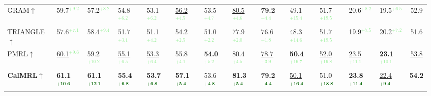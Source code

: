\begin{table}[t]
\begin{adjustbox}{width=\textwidth,center}
\begin{tabular}{@{}l|ll|ll|ll|ll|ll|ll|c@{}}
GRAM$\uparrow$  & 59.7\textcolor{lightgreen}{$^\text{+9.2}$}  & 57.2\textcolor{lightgreen}{$^\text{+8.2}$}  & 54.8\textcolor{lightgreen}{$^\text{+6.2}$} & 53.1\textcolor{lightgreen}{$^\text{+6.2}$} & \underline{56.2}\textcolor{lightgreen}{$^\text{+4.5}$} & 53.5\textcolor{lightgreen}{$^\text{+4.7}$} & \underline{80.5}\textcolor{lightgreen}{$^\text{+4.6}$} & \textbf{79.2\textcolor{lightgreen}{$^\text{+4.4}$}} & 49.1\textcolor{lightgreen}{$^\text{+15.4}$} & 51.7\textcolor{lightgreen}{$^\text{+19.5}$} & 20.6\textcolor{lightgreen}{$^\text{+8.2}$} & 19.5\textcolor{lightgreen}{$^\text{+6.5}$}  & 52.9 \\
TRIANGLE$\uparrow$  & 57.6\textcolor{lightgreen}{$^\text{+7.1}$}           & 58.4\textcolor{lightgreen}{$^\text{+9.4}$}           & 51.7\textcolor{lightgreen}{$^\text{+3.1}$}           & 51.1\textcolor{lightgreen}{$^\text{+4.2}$}           & 54.2\textcolor{lightgreen}{$^\text{+2.5}$}           & 51.0\textcolor{lightgreen}{$^\text{+2.2}$}           & 77.9\textcolor{lightgreen}{$^\text{+2.0}$}           & 76.6\textcolor{lightgreen}{$^\text{+1.8}$}           & 48.3\textcolor{lightgreen}{$^\text{+14.6}$}          & 51.7\textcolor{lightgreen}{$^\text{+19.5}$}          & 19.9\textcolor{lightgreen}{$^\text{+7.5}$}           & 20.2\textcolor{lightgreen}{$^\text{+7.2}$}    & 51.6        \\
PMRL$\uparrow$   & \underline{60.1}\textcolor{lightgreen}{$^\text{+9.6}$}           & 59.2\textcolor{lightgreen}{$^\text{+10.2}$}          & \underline{55.1}\textcolor{lightgreen}{$^\text{+6.5}$}           & \underline{53.3}\textcolor{lightgreen}{$^\text{+6.4}$}           & 55.8\textcolor{lightgreen}{$^\text{+4.1}$}           & \textbf{54.0\textcolor{lightgreen}{$^\text{+5.2}$}}           & 80.4\textcolor{lightgreen}{$^\text{+4.5}$}           & \underline{78.7}\textcolor{lightgreen}{$^\text{+3.9}$}           & \textbf{50.4\textcolor{lightgreen}{$^\text{+16.7}$}}          & \underline{52.0}\textcolor{lightgreen}{$^\text{+19.8}$}          & \underline{23.5}\textcolor{lightgreen}{$^\text{+11.1}$}          & \textbf{23.1\textcolor{lightgreen}{$^\text{+10.1}$}}     & \underline{53.8} \\
  \midrule
 \textbf{CalMRL$\uparrow$}    & \textbf{61.1\textcolor{darkgreen}{$^\textbf{+10.6}$}} & \textbf{61.1\textcolor{darkgreen}{$^\textbf{+12.1}$}} & \textbf{55.4\textcolor{darkgreen}{$^\textbf{+6.8}$}} & \textbf{53.7\textcolor{darkgreen}{$^\textbf{+6.8}$}} & \textbf{57.1\textcolor{darkgreen}{$^\textbf{+5.4}$}} & 53.6\textcolor{darkgreen}{$^\textbf{+4.8}$} & \textbf{81.3\textcolor{darkgreen}{$^\textbf{+5.4}$}} & \textbf{79.2\textcolor{darkgreen}{$^\textbf{+4.4}$}} & \underline{50.1}\textcolor{darkgreen}{$^\textbf{+16.4}$} & {51.0}\textcolor{darkgreen}{$^\textbf{+18.8}$} & \textbf{23.8\textcolor{darkgreen}{$^\textbf{+11.4}$}} & \underline{22.4}\textcolor{darkgreen}{$^\textbf{+9.4}$} & \textbf{54.2} \\
 \bottomrule
\end{tabular}
\end{adjustbox}
\end{table}
